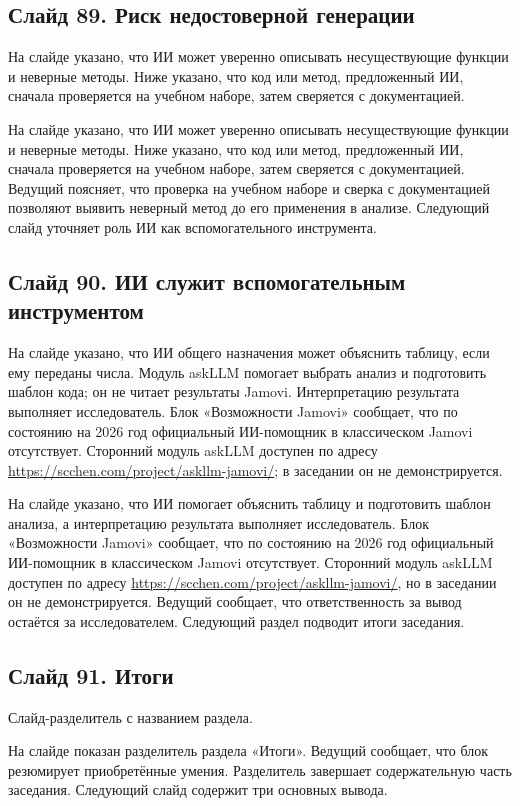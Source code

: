 \documentclass[11pt,a4paper]{article}
\begin{document}
\subsection*{Слайд 89. Риск недостоверной генерации}
\begin{onslide}
На слайде указано, что ИИ может уверенно описывать несуществующие функции и неверные методы. Ниже указано, что код или метод, предложенный ИИ, сначала проверяется на учебном наборе, затем сверяется с документацией.
\end{onslide}
На слайде указано, что ИИ может уверенно описывать несуществующие функции и неверные методы. Ниже указано, что код или метод, предложенный ИИ, сначала проверяется на учебном наборе, затем сверяется с документацией. Ведущий поясняет, что проверка на учебном наборе и сверка с документацией позволяют выявить неверный метод до его применения в анализе. Следующий слайд уточняет роль ИИ как вспомогательного инструмента.

\subsection*{Слайд 90. ИИ служит вспомогательным инструментом}
\begin{onslide}
На слайде указано, что ИИ общего назначения может объяснить таблицу, если ему переданы числа. Модуль askLLM помогает выбрать анализ и подготовить шаблон кода; он не читает результаты Jamovi. Интерпретацию результата выполняет исследователь. Блок «Возможности Jamovi» сообщает, что по состоянию на 2026 год официальный ИИ-помощник в классическом Jamovi отсутствует. Сторонний модуль askLLM доступен по адресу \url{https://scchen.com/project/askllm-jamovi/}; в заседании он не демонстрируется.
\end{onslide}
На слайде указано, что ИИ помогает объяснить таблицу и подготовить шаблон анализа, а интерпретацию результата выполняет исследователь. Блок «Возможности Jamovi» сообщает, что по состоянию на 2026 год официальный ИИ-помощник в классическом Jamovi отсутствует. Сторонний модуль askLLM доступен по адресу \url{https://scchen.com/project/askllm-jamovi/}, но в заседании он не демонстрируется. Ведущий сообщает, что ответственность за вывод остаётся за исследователем. Следующий раздел подводит итоги заседания.

\subsection*{Слайд 91. Итоги}
\begin{onslide}
Слайд-разделитель с названием раздела.
\end{onslide}
На слайде показан разделитель раздела «Итоги». Ведущий сообщает, что блок резюмирует приобретённые умения. Разделитель завершает содержательную часть заседания. Следующий слайд содержит три основных вывода.
\end{document}
